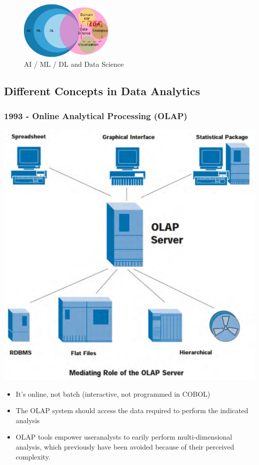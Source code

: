 \documentclass[a4paper]{article}
\begin{document}
		\begin{figure}[htb!]
			\centering
			\includegraphics[width=0.4\textwidth]{img/sw01/global_view.png}
			\caption{AI / ML / DL and Data Science}
		\end{figure}
	
		\subsection{Different Concepts in Data Analytics}
		
			\subsubsection{1993 - Online Analytical Processing (OLAP)}
			
			\begin{minipage}[c]{0.3\textwidth}
				\centering
				\includegraphics[width=\textwidth]{img/sw01/olap.png}
			\end{minipage}
			\hfill
			\begin{minipage}[c]{0.6\textwidth}
				\begin{itemize}
					\item It's online, not batch (interactive, not programmed in COBOL)
					\item The OLAP system should access the data required to perform the indicated analysis
					\item OLAP tools empower useranalysts to earily perform multi-dimensional analysis, which previously have been avoided because of their perceived complexity.
				\end{itemize}
			\end{minipage}
		
\end{document}
